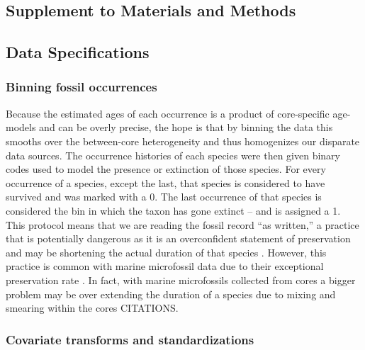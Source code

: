 \documentclass[12pt,letterpaper]{article}
\newcommand{\beginsupplement}{
  \setcounter{section}{0}
  \renewcommand{\thesection}{S\arabic{section}}
  \setcounter{table}{0}
  \renewcommand{\thetable}{S\arabic{table}}
  \setcounter{figure}{0}
  \renewcommand{\thefigure}{S\arabic{figure}}
  \setcounter{equation}{0}
  \renewcommand{\theequation}{S\arabic{equation}}
}
\begin{document}
\beginsupplement
\begin{refsection}

  
\section{Supplement to Materials and Methods}

\subsection{Data Specifications} \label{sec:data_desc}

\subsubsection{Binning fossil occurrences}

Because the estimated ages of each occurrence is a product of core-specific age-models and can be overly precise, the hope is that by binning the data this smooths over the between-core heterogeneity and thus homogenizes our disparate data sources. The occurrence histories of each species were then given binary codes used to model the presence or extinction of those species. For every occurrence of a species, except the last, that species is considered to have survived and was marked with a 0. The last occurrence of that species is considered the bin in which the taxon has gone extinct -- and is assigned a 1. This protocol means that we are reading the fossil record ``as written,'' a practice that is potentially dangerous as it is an overconfident statement of preservation and may be shortening the actual duration of that species \citep{Alroy2010,Alroy2000b,Alroy2014,Foote1997,Foote1999a,Foote2001,Foote1996e,Lloyd2012b,Marshall1995,Wang2016}. However, this practice is common with marine microfossil data due to their exceptional preservation rate \citep{Ezard2013,Ezard2016,Ezard2011,Liow2010}. In fact, with marine microfossils collected from cores a bigger problem may be over extending the duration of a species due to mixing and smearing within the cores CITATIONS.

\subsubsection{Covariate transforms and standardizations}


\end{refsection}
\end{document}
